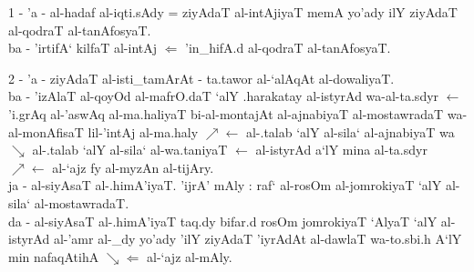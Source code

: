 1 - 'a - al-hadaf al-iqti.sAdy = ziyAdaT al-intAjiyaT memA yo'ady ilY ziyAdaT
        al-qodraT al-tanAfosyaT.\\
    \hspace{15pt}
    ba - 'irtifA` kilfaT al-intAj $\Leftarrow$ 'in_hifA.d al-qodraT
        al-tanAfosyaT.

\smallskip

2 - 'a - ziyAdaT al-isti_tamArAt - ta.tawor al-`alAqAt al-dowaliyaT.\\
    \hspace{15pt}
    ba - 'izAlaT al-qoyOd al-mafrO.daT `alY .harakatay al-istyrAd wa-al-ta.sdyr
        $\leftarrow$ 'i.grAq al-'aswAq al-ma.haliyaT bi-al-montajAt al-ajnabiyaT
        al-mostawradaT wa-al-monAfisaT lil-'intAj al-ma.haly
        $\nearrow\leftarrow$ al-.talab `alY al-sila` al-ajnabiyaT wa
        $\searrow$ al-.talab `alY al-sila` al-wa.taniyaT
        $\leftarrow$ al-istyrAd a`lY mina al-ta.sdyr
        $\nearrow\leftarrow$ al-`ajz fy al-myzAn al-tijAry.\\
    \hspace{15pt}
    ja - al-siyAsaT al-.himA'iyaT. 'ijrA' mAly : raf` al-rosOm al-jomrokiyaT
        `alY al-sila` al-mostawradaT.\\
    \hspace{15pt}
    da - al-siyAsaT al-.himA'iyaT taq.dy bifar.d rosOm jomrokiyaT `AlyaT `alY
        al-istyrAd al-'amr al-_dy yo'ady 'ilY ziyAdaT 'iyrAdAt al-dawlaT
        wa-to.sbi.h A`lY min nafaqAtihA $\searrow\Leftarrow$ al-`ajz al-mAly.

\smallskip

